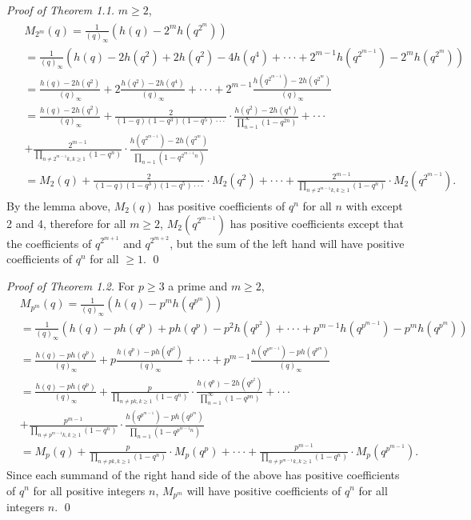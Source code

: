 \documentclass[11pt,reqno]{amsart}
\theoremstyle{definition}
\numberwithin{equation}{section}
\begin{document}
{\it Proof of Theorem 1.1.} $m\geq 2$,
\begin{multline*} \label{1}
\begin{aligned}
&M_{2^{m}}(q)
 = \frac{1}{(q)_{\infty}}(h(q)-2^{m}h(q^{2^{m}})) \\
& = \frac{1}{(q)_{\infty}}(h(q)-2h(q^2)+2h(q^{2})-4h(q^4)+\cdot\cdot\cdot
+2^{m-1}h(q^{2^{m-1}})-2^{m}h(q^{2^{m}}))\\
& =\frac{h(q)-2h(q^2)}{(q)_{\infty}}+2\frac{h(q^{2})-2h(q^4)}{(q)_{\infty}}+\cdot\cdot\cdot
+2^{m-1}\frac{h(q^{2^{m-1}})-2h(q^{2^{m}})}{(q)_{\infty}}\\
&=\frac{h(q)-2h(q^2)}{(q)_{\infty}}+
\frac{2}{(1-q)(1-q^{3})(1-q^{5})\cdot\cdot\cdot}\cdot\frac{h(q^{2})-2h(q^{4})}{\prod^{\infty}_{n=1}(1-q^{2n})}+\cdot\cdot\cdot \\
&+\frac{2^{m-1}}{\prod_{n\neq 2^{m-1}k, k\geq 1}(1-q^{n})}\cdot \frac{h(q^{2^{m-1}})-2h(q^{2^{m}})}{\prod_{n=1}(1-q^{2^{m-1}n})}\\
&=M_{2}(q)+\frac{2}{(1-q)(1-q^{3})(1-q^{5})\cdot\cdot\cdot}\cdot M_{2}(q^{2}) +  \cdot\cdot\cdot 
+ \frac{2^{m-1}}{\prod_{n\neq 2^{m-1}k, k\geq 1}(1-q^{n})}\cdot M_{2}(q^{2^{m-1}}).
\end{aligned}
\end{multline*}
\noindent By the lemma above, $M_{2}(q)$ has positive coefficients of $q^{n}$ for all $n$ with except 2 and 4, therefore for all $m\geq 2$,  $M_{2}(q^{2^{m-1}})$ has positive coefficients except that the coefficients of $q^{2^{m+1}}$ and $q^{2^{m+2}}$, but the sum of the left hand will have positive coefficients of $q^{n}$ for all $\geq 1$.
\qed



{\it Proof of Theorem 1.2.}
For $p\geq 3$ a prime and $m\geq 2$, 
\begin{equation*} 
\begin{aligned}
&M_{p^{m}}(q)
 = \frac{1}{(q)_{\infty}}(h(q)-p^{m}h(q^{p^{m}})) \\
& = \frac{1}{(q)_{\infty}}(h(q)-ph(q^p)+ph(q^{p})-p^{2}h(q^{p^{2}})+\cdot\cdot\cdot
+p^{m-1}h(q^{p^{m-1}})-p^{m}h(q^{p^{m}}))\\
& =\frac{h(q)-ph(q^p)}{(q)_{\infty}}+p\frac{h(q^{p})-ph(q^{p^{2}})}{(q)_{\infty}}+\cdot\cdot\cdot
+p^{m-1}\frac{h(q^{p^{m-1}})-ph(q^{p^{m}})}{(q)_{\infty}}\\
&=\frac{h(q)-ph(q^p)}{(q)_{\infty}}+
\frac{p}{\prod_{n\neq pk, k\geq 1}(1-q^{n})}\cdot\frac{h(q^{p})-2h(q^{p^{2}})}{\prod^{\infty}_{n=1}(1-q^{pn})}+\cdot\cdot\cdot \\
&+\frac{p^{m-1}}{\prod_{n\neq p^{m-1}k, k\geq 1}(1-q^{n})}\cdot \frac{h(q^{p^{m-1}})-ph(q^{p^{m}})}{\prod_{n=1}(1-q^{p^{m-1}n})}\\
&=M_{p}(q)+\frac{p}{\prod_{n\neq pk, k\geq 1}(1-q^{n})}\cdot M_{p}(q^{p}) +  \cdot\cdot\cdot 
+ \frac{p^{m-1}}{\prod_{n\neq p^{m-1}k, k\geq 1}(1-q^{n})}\cdot M_{p}(q^{p^{m-1}}).
\end{aligned}
\end{equation*}
Since each summand of the right hand side of the above has positive coefficients of $q^{n}$ for all positive integers $n$, $M_{p^{m}}$ will have positive coefficients
of $q^{n}$ for all integers $n$.
\qed
\end{document}
